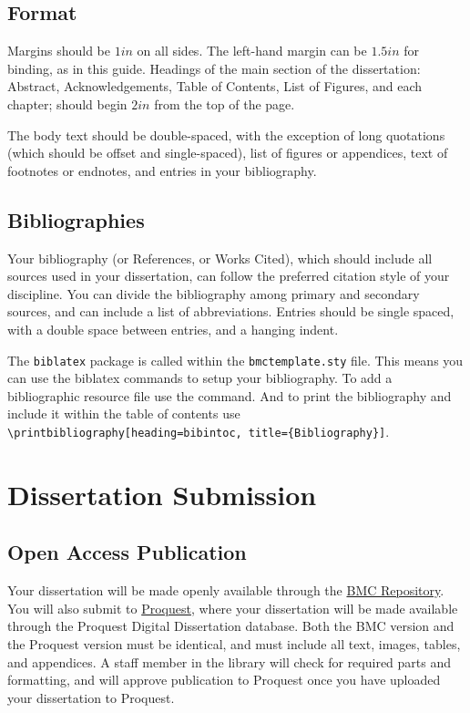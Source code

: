 \documentclass[12pt]{report}
\begin{document}
\section{Format}\label{sec:format}
Margins should be $1in$ on all sides. The left-hand margin can be $1.5in$ for binding, as in this guide. Headings of the main section of the dissertation: Abstract, Acknowledgements, Table of Contents, List of Figures, and each chapter; should begin $2in$ from the top of the page.

The body text should be double-spaced, with the exception of long quotations (which should be offset and single-spaced), list of figures or appendices, text of footnotes or endnotes, and entries in your bibliography.
\section{Bibliographies}\label{sec:biblio}
Your bibliography (or References, or Works Cited), which should include all sources used in your dissertation, can follow the preferred citation style of your discipline. You can divide the bibliography among primary and secondary sources, and can include a list of abbreviations. Entries should be single spaced, with a double space between entries, and a hanging indent.~\parencite{schaffner_temporal_2014, batchelor_1953}

The \verb|biblatex| package is called within the \verb|bmctemplate.sty| file. This means you can use the biblatex commands to setup your bibliography. 
To add a bibliographic resource file use the \verb|| command. And to print the bibliography and include it within the table of contents use \verb|\printbibliography[heading=bibintoc, title={Bibliography}]|.

\chapter{Dissertation Submission}
\section{Open Access Publication}
Your dissertation will be made openly available through the \href{https://repository.brynmawr.edu/}{BMC Repository}. You will also submit to \href{https://www.proquest.com/}{Proquest}, where your dissertation will be made available through the Proquest Digital Dissertation database. Both the BMC version and the Proquest version must be identical, and must include all text, images, tables, and appendices. A staff member in the library will check for required parts and formatting, and will approve publication to Proquest once you have uploaded your dissertation to Proquest.
\end{document}
